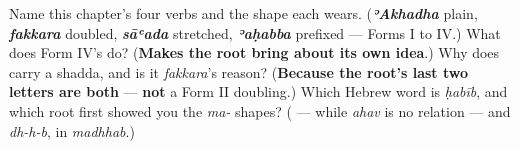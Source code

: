 \begin{tcolorbox}[breakable,colback=teal!4,colframe=teal!35!black,title={Before you move on}]
Name this chapter's four verbs and the shape each wears. (\emph{\textbf{ʾAkhadha}} plain, \emph{\textbf{fakkara}} doubled, \emph{\textbf{sāʿada}} stretched, \emph{\textbf{ʾaḥabba}} prefixed — Forms I to IV.) What does Form IV's \textbf{} do? (\textbf{Makes the root bring about its own idea}.) Why does \textbf{} carry a shadda, and is it \emph{fakkara}'s reason? (\textbf{Because the root's last two letters are both } — \textbf{not} a Form II doubling.) Which Hebrew word is \emph{ḥabīb}, and which root first showed you the \emph{ma-} shapes? (\emph{\textbf{}} — while \emph{ahav} is no relation — and \emph{dh-h-b}, in \emph{madhhab}.)
\end{tcolorbox}
